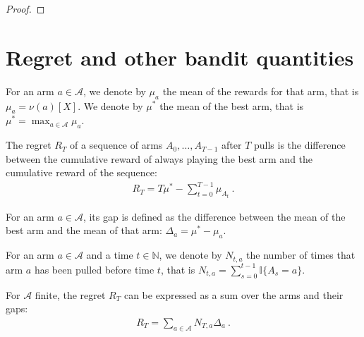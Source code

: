 \begin{proof}\leanok

\end{proof}



\section{Regret and other bandit quantities}

\begin{definition}\label{def:armMean}
  \leanok %
For an arm $a \in \mathcal{A}$, we denote by $\mu_a$ the mean of the rewards for that arm, that is $\mu_a = \nu(a)[X]$.
We denote by $\mu^*$ the mean of the best arm, that is $\mu^* = \max_{a \in \mathcal{A}} \mu_a$.
\end{definition}


\begin{definition}[Regret]\label{def:regret}
  \leanok
The regret $R_T$ of a sequence of arms $A_0, \ldots, A_{T-1}$ after $T$ pulls is the difference between the cumulative reward of always playing the best arm and the cumulative reward of the sequence:
\begin{align*}
  R_T = T \mu^* - \sum_{t=0}^{T-1} \mu_{A_t} \: .
\end{align*}
\end{definition}


\begin{definition}\label{def:gap}
  \leanok
For an arm $a \in \mathcal{A}$, its gap is defined as the difference between the mean of the best arm and the mean of that arm: $\Delta_a = \mu^* - \mu_a$.
\end{definition}


\begin{definition}\label{def:pullCount}
  \leanok
For an arm $a \in \mathcal{A}$ and a time $t \in \mathbb{N}$, we denote by $N_{t,a}$ the number of times that arm $a$ has been pulled before time $t$, that is $N_{t,a} = \sum_{s=0}^{t-1} \mathbb{I}\{A_s = a\}$.
\end{definition}


\begin{lemma}\label{lem:regret_eq_sum_pullCount_mul_gap}
  \leanok
For $\mathcal{A}$ finite, the regret $R_T$ can be expressed as a sum over the arms and their gaps:
\begin{align*}
  R_T = \sum_{a \in \mathcal{A}} N_{T,a} \Delta_a \: .
\end{align*}
\end{lemma}


